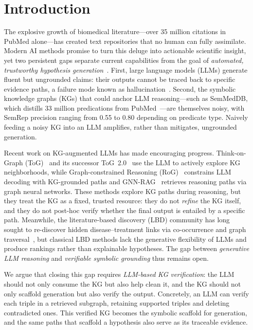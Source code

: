 \section{Introduction}
\label{sec:intro}

The explosive growth of biomedical literature---over 35 million citations in PubMed alone---has created text repositories that no human can fully assimilate. Modern AI methods promise to turn this deluge into actionable scientific insight, yet two persistent gaps separate current capabilities from the goal of \emph{automated, trustworthy hypothesis generation}~\cite{zhang2025exploring,bhasuran2023literature}. First, large language models (LLMs) generate fluent but ungrounded claims: their outputs cannot be traced back to specific evidence paths, a failure mode known as hallucination~\cite{zhao2026survey,brown2025systematic}. Second, the symbolic knowledge graphs (KGs) that could anchor LLM reasoning---such as SemMedDB, which distills 33 million predications from PubMed~\cite{kilicoglu2012semmeddb,kilicoglu2020broadcoverage}---are themselves noisy, with SemRep precision ranging from 0.55 to 0.80 depending on predicate type. Naively feeding a noisy KG into an LLM amplifies, rather than mitigates, ungrounded generation.

Recent work on KG-augmented LLMs has made encouraging progress. Think-on-Graph (ToG)~\cite{sun2023thinkongraph} and its successor ToG~2.0~\cite{ma2024thinkongraph} use the LLM to actively explore KG neighborhoods, while Graph-constrained Reasoning (RoG)~\cite{luo2024graphconstrained} constrains LLM decoding with KG-grounded paths and GNN-RAG~\cite{mavromatis2025gnnrag} retrieves reasoning paths via graph neural networks. These methods explore KG paths during reasoning, but they treat the KG as a fixed, trusted resource: they do not \emph{refine} the KG itself, and they do not post-hoc verify whether the final output is entailed by a specific path. Meanwhile, the literature-based discovery (LBD) community has long sought to re-discover hidden disease--treatment links via co-occurrence and graph traversal~\cite{swanson1986undiscovered,hristovski2015constructing,bhasuran2023literature}, but classical LBD methods lack the generative flexibility of LLMs and produce rankings rather than explainable hypotheses. The gap between \emph{generative LLM reasoning} and \emph{verifiable symbolic grounding} thus remains open.

We argue that closing this gap requires \emph{LLM-based KG verification}: the LLM should not only consume the KG but also help clean it, and the KG should not only scaffold generation but also verify the output. Concretely, an LLM can verify each triple in a retrieved subgraph, retaining supported triples and deleting contradicted ones. This verified KG becomes the symbolic scaffold for generation, and the same paths that scaffold a hypothesis also serve as its traceable evidence.

